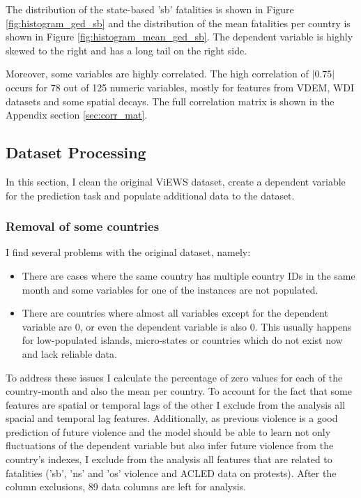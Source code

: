 \documentclass[runningheads]{llncs}
\begin{document}
    The distribution of the state-based 'sb' fatalities is shown in Figure \ref{fig:histogram_ged_sb} and the distribution of the mean fatalities per country is shown in Figure \ref{fig:histogram_mean_ged_sb}. The dependent variable is highly skewed to the right and has a long tail on the right side.

    Moreover, some variables are highly correlated. The high correlation of $|0.75|$ occurs for 78 out of 125 numeric variables, mostly for features from VDEM, WDI datasets and some spatial decays. The full correlation matrix is shown in the Appendix section \ref{sec:corr_mat}.



    \subsection{Dataset Processing}
    In this section, I clean the original ViEWS dataset, create a dependent variable for the prediction task and populate additional data to the dataset.

    \subsubsection{Removal of some countries}
    I find several problems with the original dataset, namely:
    \begin{itemize}
        \item There are cases where the same country has multiple country IDs in the same month and some variables for one of the instances are not populated.
        \item There are countries where almost all variables except for the dependent variable are 0, or even the dependent variable is also 0. This usually happens for low-populated islands, micro-states or countries which do not exist now and lack reliable data.
    \end{itemize}



    To address these issues I calculate the percentage of zero values for each of the country-month and also the mean per country. To account for the fact that some features are spatial or temporal lags of the other I exclude from the analysis all spacial and temporal lag features. Additionally, as previous violence is a good prediction of future violence and the model should be able to learn not only fluctuations of the dependent variable but also infer future violence from the country's indexes, I exclude from the analysis all features that are related to fatalities ('sb', 'ns' and 'os' violence and ACLED data on protests). After the column exclusions, 89 data columns are left for analysis.
\end{document}

